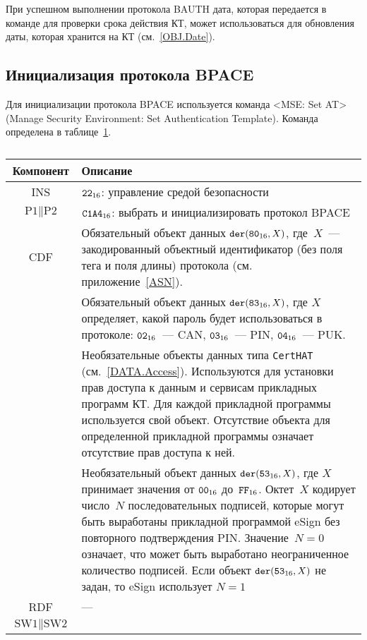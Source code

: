 При успешном выполнении протокола BAUTH дата, которая передается в команде 
для проверки срока действия КТ, может использоваться для обновления 
даты, которая хранится на КТ (см.~\ref{OBJ.Date}). 

\subsection{Инициализация протокола BPACE}
\label{Oper.Descr.SetBPACE}

Для инициализации протокола BPACE используется команда
<MSE: Set AT> (Manage Security Environment: Set Authentication Template). 
%
Команда определена в таблице~\ref{Table.Oper.SetBPACECmd}. 

\begin{table}[h!]
\caption{}\label{Table.Oper.SetBPACECmd}
\begin{tabular}{|c|p{14cm}|}
\hline
Компонент & Описание \\
\hline
\hline
INS & $\texttt{22}_{16}$: управление средой безопасности\\ 
\hline
$\text{P1} \parallel\text{P2}$ & $\texttt{C1A4}_{16}$: выбрать и 
инициализировать протокол BPACE\\ 
\hline
CDF & Обязательный объект данных 
$\texttt{der}(\texttt{80}_{16}, X)$, где~$X$~--- 
закодированный объектный идентификатор (без поля тега и поля 
длины) протокола (см. приложение~\ref{ASN}).\\
& Обязательный объект данных $\texttt{der}(\texttt{83}_{16}, X)$, 
где $X$ определяет, какой пароль будет использоваться в протоколе: 
$\texttt{02}_{16}$~--- CAN,  $\texttt{03}_{16}$~--- PIN, 
$\texttt{04}_{16}$~--- PUK.\\
& 
Необязательные объекты данных типа \texttt{CertHAT} (см.~\ref{DATA.Access}). 
Используются для установки прав доступа к данным и сервисам 
прикладных программ КТ. 
Для каждой прикладной программы используется свой объект.
Отсутствие объекта для определенной прикладной
программы означает отсутствие прав доступа к ней.\\
 & Необязательный объект данных $\texttt{der}(\texttt{53}_{16}, X)$, 
где $X$ принимает значения от $\texttt{00}_{16}$ до~$\texttt{FF}_{16}$.
Октет~$X$ кодирует число~$N$ последовательных подписей,  
которые могут быть выработаны прикладной программой eSign
без повторного подтверждения PIN.
%
Значение~$N=0$ означает, что может быть выработано 
неограниченное количество подписей. 
%
Если объект $\texttt{der}(\texttt{53}_{16}, X)$ не задан, то eSign 
использует $N=1$\\
\hline 
\hline
RDF &  --- \\
\hline
$\text{SW1} \parallel \text{SW2}$ & 

\end{tabular}
\end{table}
